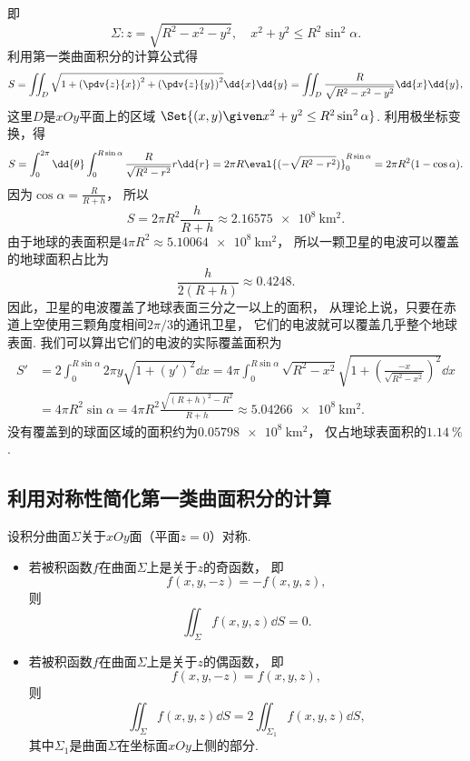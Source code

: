 \begin{example}
即\[
	\Sigma: z=\sqrt{R^2-x^2-y^2}, \quad x^2+y^2 \leq R^2\sin^2\alpha.
\]
利用第一类曲面积分的计算公式得\[
	S = \iint_D \sqrt{1+\left(\pdv{z}{x}\right)^2+\left(\pdv{z}{y}\right)^2} \dd{x}\dd{y}
	= \iint_D \frac{R}{\sqrt{R^2-x^2-y^2}} \dd{x}\dd{y},
\]
这里\(D\)是\(xOy\)平面上的区域
\(\Set{ (x,y) \given x^2+y^2 \leq R^2\sin^2\alpha }\).
利用极坐标变换，得\[
	S = \int_0^{2\pi} \dd{\theta}
	\int_0^{R\sin\alpha} \frac{R}{\sqrt{R^2-r^2}} r\dd{r}
	= 2\pi R \eval{(-\sqrt{R^2-r^2})}_0^{R\sin\alpha}
	= 2\pi R^2(1-\cos\alpha).
\]
因为\(\cos\alpha=\frac{R}{R+h}\)，
所以\[
	S = 2\pi R^2\frac{h}{R+h}
	\approx \qty{2.16575e8}{\kilo\meter\squared}.
\]
由于地球的表面积是\(4\pi R^2 \approx \qty{5.10064e8}{\kilo\meter\squared}\)，
所以一颗卫星的电波可以覆盖的地球面积占比为\[
	\frac{h}{2(R+h)}
	\approx \num{0.4248}.
\]
因此，卫星的电波覆盖了地球表面三分之一以上的面积，
从理论上说，只要在赤道上空使用三颗角度相间\(2\pi/3\)的通讯卫星，
它们的电波就可以覆盖几乎整个地球表面.
我们可以算出它们的电波的实际覆盖面积为\begin{align*}
	S' &= 2\int_0^{R\sin\alpha} 2\pi y \sqrt{1+(y')^2} \dd{x}
	= 4\pi \int_0^{R\sin\alpha} \sqrt{R^2-x^2} \sqrt{1+\left(\frac{-x}{\sqrt{R^2-x^2}}\right)^2} \dd{x} \\
	&= 4\pi R^2\sin\alpha
	= 4\pi R^2 \frac{\sqrt{(R+h)^2-R^2}}{R+h}
	\approx \qty{5.04266e8}{\kilo\meter\squared}.
\end{align*}
没有覆盖到的球面区域的面积约为\(\qty{0.05798e8}{\kilo\meter\squared}\)，
仅占地球表面积的\(\qty{1.14}{\percent}\).
\end{example}

\subsection{利用对称性简化第一类曲面积分的计算}
设积分曲面\(\Sigma\)关于\(xOy\)面（平面\(z=0\)）对称.
\begin{itemize}
	\item 若被积函数\(f\)在曲面\(\Sigma\)上是关于\(z\)的奇函数，
	即\[
		f(x,y,-z) = -f(x,y,z),
	\]
	则\[
		\iint_\Sigma f(x,y,z) \dd{S} = 0.
	\]

	\item 若被积函数\(f\)在曲面\(\Sigma\)上是关于\(z\)的偶函数，
	即\[
		f(x,y,-z) = f(x,y,z),
	\]
	则\[
		\iint_\Sigma f(x,y,z) \dd{S}
		= 2 \iint_{\Sigma_1} f(x,y,z) \dd{S},
	\]
	其中\(\Sigma_1\)是曲面\(\Sigma\)在坐标面\(xOy\)上侧的部分.
\end{itemize}

